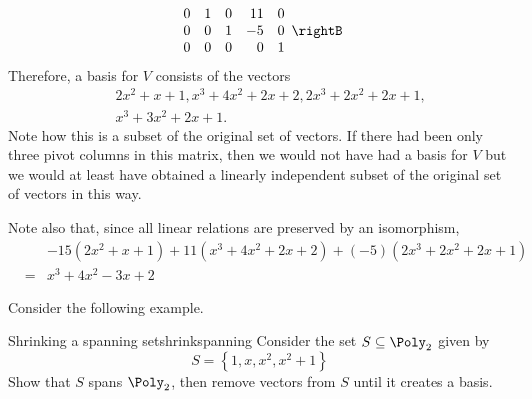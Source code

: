 \begin{solution}
\begin{equation*}
\begin{array}{rrrrr}
0 & 1 & 0 & 11 & 0 \\ 
0 & 0 & 1 & -5 & 0 \\ 
0 & 0 & 0 & 0 & 1
\end{array}
\rightB
\end{equation*}
Therefore, a basis for $V$ consists of the vectors
\begin{eqnarray*}
&&2x^{2}+x+1,x^{3}+4x^{2}+2x+2,2x^{3}+2x^{2}+2x+1, \\
&&x^{3}+3x^{2}+2x+1.
\end{eqnarray*}
Note how this is a subset of the original set of vectors. If there had been
only three pivot columns in this matrix, then we would not have had a basis
for $V$ but we would at least have obtained a linearly independent subset of
the original set of vectors in this way. 

Note also that, since all linear relations are preserved by an isomorphism,
\begin{eqnarray*}
&&-15\left( 2x^{2}+x+1\right) +11\left( x^{3}+4x^{2}+2x+2\right) +\left(
-5\right) \left( 2x^{3}+2x^{2}+2x+1\right) \\
&=&x^{3}+4x^{2}-3x+2
\end{eqnarray*}

\end{solution}

Consider the following example.

\begin{example}{Shrinking a spanning set}{shrinkspanning}
Consider the set $S \subseteq \Poly_2$ given by 
\[
S = \left\{ 1, x, x^2, x^2 + 1 \right\}
\]
Show that $S$ spans $\Poly_2$, then remove vectors from $S$ until it creates a basis. 
\end{example}

